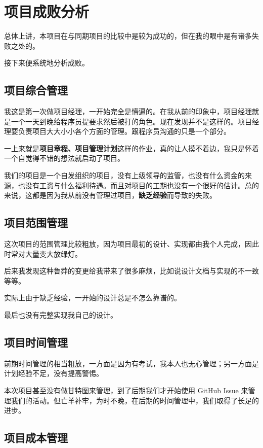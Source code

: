\chapter{项目成败分析}

总体上讲，本项目在与同期项目的比较中是较为成功的，但在我的眼中是有诸多失败之处的。

接下来便系统地分析成败。

\section{项目综合管理}

我这是第一次做项目经理，一开始完全是懵逼的。在我从前的印象中，项目经理就是一个一天到晚给程序员提要求然后被打的角色。现在发现并不是这样的。项目经理要负责项目大大小小各个方面的管理。跟程序员沟通的只是一个部分。

一上来就是\textbf{项目章程、项目管理计划}这样的作业，真的让人摸不着边，我只是怀着一个自觉得不错的想法就启动了项目。

我们的项目是一个自发组织的项目，没有上级领导的监管，也没有什么资金的来源，也没有工资与什么福利待遇。而且对项目的工期也没有一个很好的估计。总的来说，这都是因为我从前没有管理过项目，\textbf{缺乏经验}而导致的失败。

\section{项目范围管理}

这次项目的范围管理比较粗放，因为项目最初的设计、实现都由我个人完成，因此时常对大量变大放绿灯。

后来我发现这种鲁莽的变更给我带来了很多麻烦，比如说设计文档与实现的不一致等等。

实际上由于缺乏经验，一开始的设计总是不怎么靠谱的。

最后也没有完整实现我自己的设计。

\section{项目时间管理}

前期时间管理的相当粗放，一方面是因为有考试，我本人也无心管理；另一方面是计划经验不足，没有提高警惕。

本次项目甚至没有做甘特图来管理，到了后期我们才开始使用 GitHub Issue 来管理我们的活动。但亡羊补牢，为时不晚，在后期的时间管理中，我们取得了长足的进步。

\section{项目成本管理}


